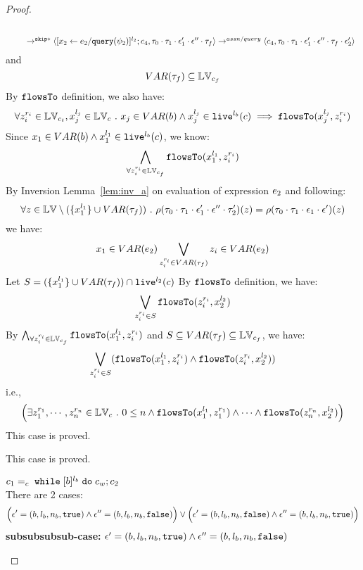 {\begin{proof}
\begin{subproof}
\begin{enumerate}
\begin{enumerate}
\[\begin{array}{l}
  \\
  \qquad \rightarrow^{\mathtt{skip}*} 
  \langle [\mathrel{ {x}_2 \leftarrow e_2 / {\tt query}(\psi_2) }]^{l_2};{c}_4, 
  \mathtt{\tau}_0 \cdot \mathtt{\tau}_1 \cdot \mathtt{\epsilon}_1' \cdot \mathtt{\epsilon}'' \cdot \mathtt{\tau}_f \rangle
  \rightarrow^{assn/query} 
  \langle {c}_4,  \mathtt{\tau}_0 \cdot \mathtt{\tau}_1 \cdot \mathtt{\epsilon}_1' \cdot \mathtt{\epsilon}'' \cdot \mathtt{\tau}_f \cdot \mathtt{\epsilon}_2' \rangle 
\end{array}
\]
and 
\[
  VAR{(\mathtt{\tau}_f)} \subseteq \mathbb{LV}_{c_f}
\]
%
By $\mathtt{flowsTo}$ definition, we also have:
\[
  \forall z_i^{r_i} \in \mathbb{LV}_{c_t},  x_j^{l_j} \in \mathbb{LV}_c ~.~ 
  x_j \in VAR(b) \land x_j^{l_j} \in \mathtt{live}^{l_b}(c) \implies
  \mathtt{flowsTo}(x_j^{l_j}, z_i^{r_i})
\]
Since $x_1 \in VAR(b) \land x_1^{l_1} \in \mathtt{live}^{l_b}(c)$, we know: 
\[
  \bigwedge_{\forall z_i^{r_i} \in \mathbb{LV}_{c_f}}
  \mathtt{flowsTo}(x_1^{l_1}, z_i^{r_i})
\]
%
By Inversion Lemma~\ref{lem:inv_a} on evaluation of expression $e_2$ and following: 
\[
  \forall z \in \mathbb{LV} \setminus (\{x_1^{l_1}\} \cup VAR{(\mathtt{\tau}_f)}) ~.~
  \rho(\mathtt{\tau}_0 \cdot \mathtt{\tau}_1 \cdot \mathtt{\epsilon}_1'\cdot \mathtt{\epsilon}'' \cdot \mathtt{\tau}_2')(z) 
  = \rho(\mathtt{\tau}_0 \cdot \mathtt{\tau}_1 \cdot \mathtt{\epsilon}_1\cdot \mathtt{\epsilon}')(z)
\]
%
we have:
\[
  x_1 \in VAR(e_2) \bigvee_{z_i^{r_i} \in VAR{(\mathtt{\tau}_f)}} z_i \in VAR(e_2)
\]
%
Let $S = (\{x_1^{l_1}\} \cup VAR{(\mathtt{\tau}_f)}) \cap \mathtt{live}^{l_2}(c) $
%
By $\mathtt{flowsTo}$ definition, we have:
\[
   \bigvee_{z_i^{r_i} \in S}  \mathtt{flowsTo}(z_i^{r_i}, x_2^{l_2})
\]
By $ \bigwedge_{\forall z_i^{r_i} \in \mathbb{LV}_{c_f}} \mathtt{flowsTo}(x_1^{l_1}, z_i^{r_i})$ and $S \subseteq VAR{(\mathtt{\tau}_f)} \subseteq \mathbb{LV}_{c_f}$, we have:
\[
\bigvee_{z_i^{r_i} \in S} 
(\mathtt{flowsTo}(x_1^{l_1}, z_i^{r_i}) \land \mathtt{flowsTo}(z_i^{r_i}, x_2^{l_2}))
\]
%
i.e.,
\[
\Big(\exists z_1^{r_1}, \cdots, z_n^{r_n} \in \mathbb{LV}_{{c}} ~.~ 0 \leq n 
 \land \mathtt{flowsTo}(x_1^{l_1}, z_1^{r_1}) \land \cdots \land \mathtt{flowsTo}(z_n^{r_n}, {x}_2^{l_2}) \Big)
\]
%
This case is proved.
\end{enumerate}
%
\end{enumerate}
%
This case is proved.
\end{subproof}
%
\begin{subproof} $c_1 =_c \;\mathtt{while}\; [b]^{l_b} \;\mathtt{do}\; c_w;{c}_2$ 
%
\\
There are 2 cases:
$$
\Big(\mathtt{\epsilon}' = (b, l_b, n_b, \mathtt{true}) \land \mathtt{\epsilon}'' = (b, l_b, n_b, \mathtt{false}) \Big)
\lor 
\Big(\mathtt{\epsilon}' = (b, l_b, n_b, \mathtt{false}) \land \mathtt{\epsilon}'' = (b, l_b, n_b, \mathtt{true}) \Big)
$$
%
\textbf{subsubsubsub-case:} $\mathtt{\epsilon}' = (b, l_b, n_b, \mathtt{true}) \land \mathtt{\epsilon}'' = (b, l_b, n_b, \mathtt{false})$

\end{subproof}
\end{proof}}

